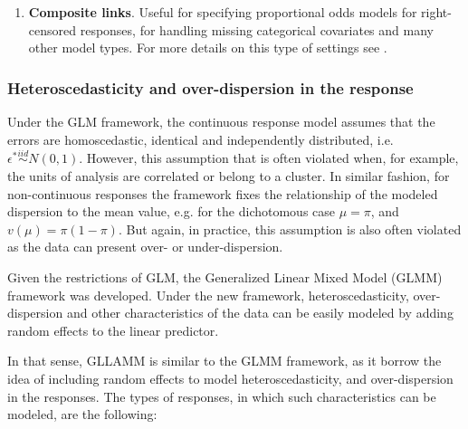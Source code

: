 \begin{enumerate}
\begin{enumerate}
		
		\item \textbf{Composite links}. Useful for specifying proportional odds models for right-censored responses, for handling missing categorical covariates and many other model types. For more details on this type of settings see \citet{Skrondal_et_al_2004b}.
	\end{enumerate}
	
	

	


\end{enumerate}

\subsubsection{Heteroscedasticity and over-dispersion in the response}

Under the GLM framework, the continuous response model assumes that the errors are homoscedastic, identical and independently distributed, i.e. $\epsilon^{*} \overset{iid}{\sim} N(0,1)$. However, this assumption that is often violated when, for example, the units of analysis are correlated or belong to a cluster. In similar fashion, for non-continuous responses the framework fixes the relationship of the modeled dispersion to the mean value, e.g. for the dichotomous case $\mu = \pi$, and $v(\mu) = \pi (1-\pi)$. But again, in practice, this assumption is also often violated as the data can present over- or under-dispersion. 

Given the restrictions of GLM, the Generalized Linear Mixed Model (GLMM) framework was developed. Under the new framework, heteroscedasticity, over-dispersion and other characteristics of the data can be easily modeled by adding random effects to the linear predictor. 

In that sense, GLLAMM is similar to the GLMM framework, as it borrow the idea of including random effects to model heteroscedasticity, and over-dispersion in the responses. The types of responses, in which such characteristics can be modeled, are the following:

